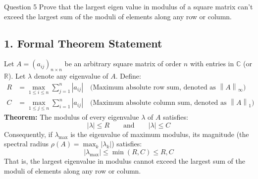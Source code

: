 \documentclass[11pt,a4paper]{article}
\newcommand{\R}{\mathbb{R}}
\newcommand{\C}{\mathbb{C}}
\newcommand{\abs}[1]{\left\lvert#1\right\rvert}
\newcommand{\norm}[1]{\left\lVert#1\right\rVert}
\begin{document}
\begin{questionbox}{Question 5}
Prove that the largest eigen value in modulus of a square matrix can't exceed the largest sum of the moduli of elements along any row or column.
\end{questionbox}

\subsection*{1. Formal Theorem Statement}
Let $A = (a_{ij})_{n \times n}$ be an arbitrary square matrix of order $n$ with entries in $\C$ (or $\R$). Let $\lambda$ denote any eigenvalue of $A$. Define:
\begin{align}
R &= \max_{1 \le i \le n} \sum_{j=1}^n \abs{a_{ij}} \quad \text{(Maximum absolute row sum, denoted as } \norm{A}_\infty\text{)} \\
C &= \max_{1 \le j \le n} \sum_{i=1}^n \abs{a_{ij}} \quad \text{(Maximum absolute column sum, denoted as } \norm{A}_1\text{)}
\end{align}
\textbf{Theorem:} The modulus of every eigenvalue $\lambda$ of $A$ satisfies:
\begin{equation}
\abs{\lambda} \le R \qquad \text{and} \qquad \abs{\lambda} \le C
\end{equation}
Consequently, if $\lambda_{\max}$ is the eigenvalue of maximum modulus, its magnitude (the spectral radius $\rho(A) = \max_k \abs{\lambda_k}$) satisfies:
\begin{equation}
\abs{\lambda_{\max}} \le \min(R, C) \le R, C
\end{equation}
That is, the largest eigenvalue in modulus cannot exceed the largest sum of the moduli of elements along any row or column.
\end{document}
